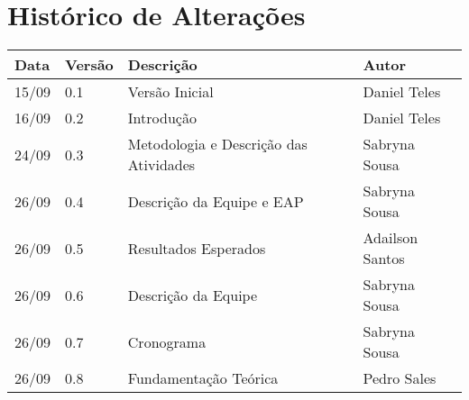 \chapter*{Histórico de Alterações}

\begin{table}[!htbp]
\centering
\label{my-label}
\begin{tabular}{|l|l|l|l|}
\hline
\textbf{Data} & \textbf{Versão} & \textbf{Descrição} & \textbf{Autor} \\ \hline
15/09         & 0.1             & Versão Inicial     & Daniel Teles   \\ \hline
16/09         & 0.2             & Introdução         & Daniel Teles   \\ \hline
24/09         & 0.3             & Metodologia e Descrição das Atividades       & Sabryna Sousa  \\ \hline
26/09         & 0.4             & Descrição da Equipe e EAP       & Sabryna Sousa  \\ \hline
26/09         & 0.5             & Resultados Esperados       & Adailson Santos  \\ \hline
26/09         & 0.6             & Descrição da Equipe       & Sabryna Sousa  \\ \hline
26/09         & 0.7             & Cronograma       & Sabryna Sousa  \\ \hline
26/09         & 0.8             & Fundamentação Teórica     & Pedro Sales\\ \hline

\end{tabular}
\end{table}

\cleardoublepage
